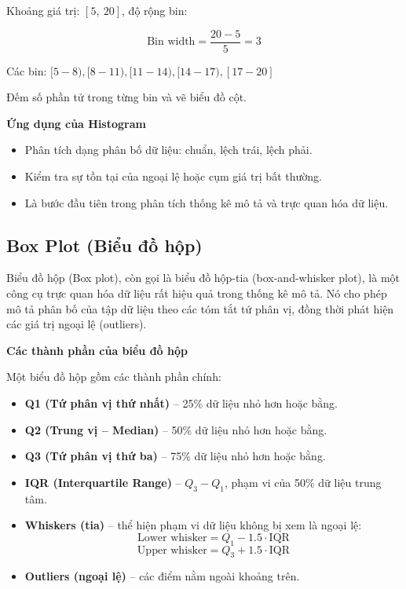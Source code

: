 \noindent
Khoảng giá trị: \([5,\ 20]\), độ rộng bin:

\[
\text{Bin width} = \frac{20 - 5}{5} = 3
\]

\noindent
Các bin: \([5-8), [8-11), [11-14), [14-17), [17-20]\)

\noindent
Đếm số phần tử trong từng bin và vẽ biểu đồ cột.

\textbf{Ứng dụng của Histogram}

\begin{itemize}
    \item Phân tích dạng phân bố dữ liệu: chuẩn, lệch trái, lệch phải.
    \item Kiểm tra sự tồn tại của ngoại lệ hoặc cụm giá trị bất thường.
    \item Là bước đầu tiên trong phân tích thống kê mô tả và trực quan hóa dữ liệu.
\end{itemize}

\subsection {Box Plot (Biểu đồ hộp)} 
\label{graph:boxplot}

Biểu đồ hộp (Box plot), còn gọi là biểu đồ hộp-tia (box-and-whisker plot), là một công cụ trực quan hóa dữ liệu rất hiệu quả trong thống kê mô tả. Nó cho phép mô tả phân bố của tập dữ liệu theo các tóm tắt tứ phân vị, đồng thời phát hiện các giá trị ngoại lệ (outliers).

\textbf{Các thành phần của biểu đồ hộp}

Một biểu đồ hộp gồm các thành phần chính:

\begin{itemize}
    \item \textbf{Q1 (Tứ phân vị thứ nhất)} – 25\% dữ liệu nhỏ hơn hoặc bằng.
    \item \textbf{Q2 (Trung vị – Median)} – 50\% dữ liệu nhỏ hơn hoặc bằng.
    \item \textbf{Q3 (Tứ phân vị thứ ba)} – 75\% dữ liệu nhỏ hơn hoặc bằng.
    \item \textbf{IQR (Interquartile Range)} – \( Q_3 - Q_1 \), phạm vi của 50\% dữ liệu trung tâm.
    \item \textbf{Whiskers (tia)} – thể hiện phạm vi dữ liệu không bị xem là ngoại lệ:
    \[
    \text{Lower whisker} = Q_1 - 1.5 \cdot \text{IQR}
    \]
    \[
    \text{Upper whisker} = Q_3 + 1.5 \cdot \text{IQR}
    \]
    \item \textbf{Outliers (ngoại lệ)} – các điểm nằm ngoài khoảng trên.
\end{itemize}

